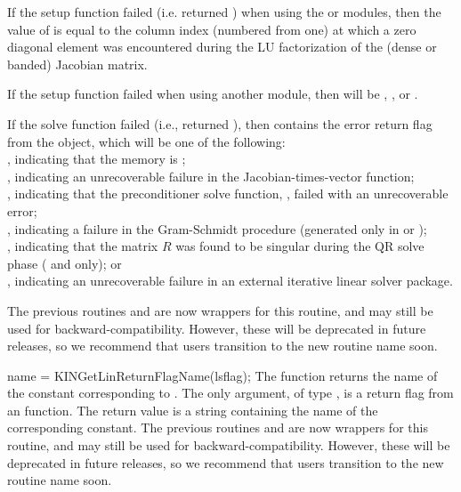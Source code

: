 {
  If the {\kinls} setup function failed (i.e.  returned
  ) when using the {\sunlinsoldense} or
  {\sunlinsolband} modules, then the value of  is equal to
  the column index (numbered from one) at which a zero diagonal
  element was encountered during the LU factorization of the (dense or
  banded) Jacobian matrix.

  If the {\kinls} setup function failed when using another
  {\sunlinsol} module, then  will be
  , , or
  .

  If the {\kinls} solve function failed (i.e.,  returned
  ), then  contains the error return
  flag from the {\sunlinsol} object, which will be one of the following: \\
  , indicating that the {\sunlinsol} memory is ; \\
  , indicating an unrecoverable failure in the
  Jacobian-times-vector function; \\
  , indicating that the preconditioner solve
  function, , failed with an unrecoverable error; \\
  , indicating a failure in the Gram-Schmidt procedure
  (generated only in {\spgmr} or {\spfgmr}); \\
  , indicating that the matrix $R$ was found to be
  singular during the QR solve phase ({\spgmr} and {\spfgmr} only); or  \\
  , indicating an unrecoverable
  failure in an external iterative linear solver package.

  The previous routines  and
   are now wrappers for this routine, and may
  still be used for backward-compatibility.  However, these will be
  deprecated in future releases, so we recommend that users transition
  to the new routine name soon.
}
{
  name = KINGetLinReturnFlagName(lsflag);
}
{
  The function  returns the
  name of the {\kinls} constant corresponding to .
}
{
  The only argument, of type , is a return flag from an {\kinls} function.
}
{
  The return value is a string containing the name of the corresponding constant.
}
{
  The previous routines  and
   are now wrappers for this routine, and may
  still be used for backward-compatibility.  However, these will be
  deprecated in future releases, so we recommend that users transition
  to the new routine name soon.
}


